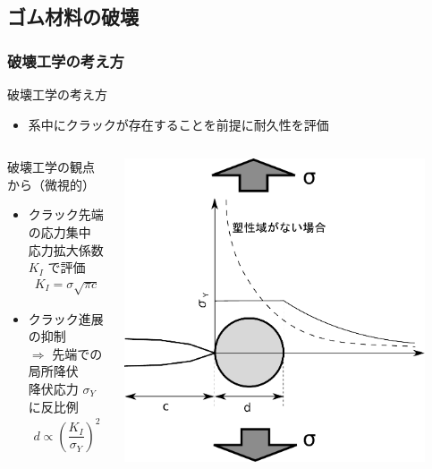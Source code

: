 \documentclass[12pt, dvipdfmx]{beamer}
\begin{document}
\subsection{ゴム材料の破壊}
\begin{frame}
    \frametitle{破壊工学の考え方}
    \begin{exampleblock}{破壊工学の考え方}
    
    \begin{itemize}
    \item
    系中に\alert{クラックが存在することを前提}に耐久性を評価
    \end{itemize}
    \end{exampleblock}
    \begin{columns}[totalwidth=1\textwidth]
    \begin{alertblock}{破壊工学の観点から（微視的）}
        \begin{itemize}
            \item
            クラック先端の応力集中\\ \alert{応力拡大係数 $K_I$ で評価}
            \footnotesize
            \begin{align*}
            K_{I} = \sigma \sqrt{\pi c}
            \end{align*}
            \normalsize
            \item 
            クラック進展の抑制 \\
            $\Rightarrow$ 先端での\alert{局所降伏}\\
            降伏応力 $\sigma_Y$ に反比例
            \footnotesize
            \begin{align*}
            d \propto \left( \dfrac{K_I}{\sigma_Y} \right)^2
            \end{align*}
            \normalsize
        \end{itemize}
    \end{alertblock}
        \centering
        \includegraphics[width=0.9\textwidth]{./Crack_Yield.pdf}

\end{columns}
\end{frame}
\end{document}
